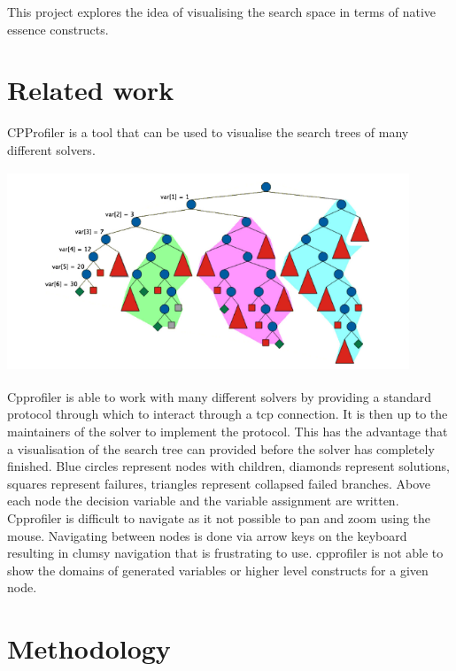 \documentclass{article}
\begin{document}
This project explores the idea of visualising the search space in terms of native essence constructs.

\section{Related work}

CPProfiler is a tool that can be used to visualise the search trees of many different solvers. 

\includegraphics[width=12cm, height=6cm]{cpprofiler.png}

Cpprofiler is able to work with many different solvers by providing a standard protocol through which to interact through a tcp connection. It is then up to the maintainers of the solver to implement the protocol. This has the advantage that a visualisation of the search tree can provided before the solver has completely finished. Blue circles represent nodes with children, diamonds represent solutions, squares represent failures, triangles represent collapsed failed branches. Above each node the decision variable and the variable assignment are written. \\

Cpprofiler is difficult to navigate as it not possible to pan and zoom using the mouse. Navigating between nodes is done via arrow keys on the keyboard resulting in clumsy navigation that is frustrating to use. cpprofiler is not able to show the domains of generated variables or higher level constructs for a given node. 

\section{Methodology}
\end{document}
